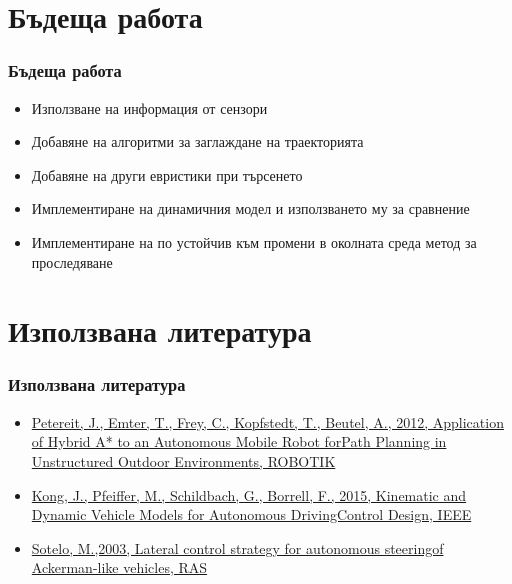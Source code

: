 \documentclass[hyperref=unicode]{beamer}
\begin{document}
  \section{Бъдеща работа}
    \begin{frame}
    \frametitle{Бъдеща работа}
     \begin{itemize}
      \item{Използване на информация от сензори}
      \item{Добавяне на алгоритми за заглаждане на траекторията}
      \item{Добавяне на други евристики при търсенето}
      \item{Имплементиране на динамичния модел и използването му за сравнение}
      \item{Имплементиране на по устойчив към промени в околната среда метод за проследяване}
    \end{itemize}  
    \end{frame}
  \section{Използвана литература}
    \begin{frame}
      \frametitle{Използвана литература}
      \begin{itemize}
        \item[]{\hyperlink{https://pdfs.semanticscholar.org/6e00/16024b257040db590d2de352556f64f46787.pdf}{Petereit, J., Emter, T., Frey, C., Kopfstedt, T., Beutel, A., 2012, Application of Hybrid A* to an Autonomous Mobile Robot forPath Planning in Unstructured Outdoor Environments, ROBOTIK}}
        \item[]{\hyperlink{https://borrelli.me.berkeley.edu/pdfpub/IV_KinematicMPC_jason.pdf}{Kong, J., Pfeiffer, M., Schildbach, G., Borrell, F., 2015, Kinematic  and  Dynamic  Vehicle  Models  for  Autonomous  DrivingControl  Design, IEEE}}
        \item[]{\hyperlink{http://www.robesafe.com/personal/sotelo/RASLateralControl2003.pdf}{Sotelo, M.,2003, Lateral control strategy for autonomous steeringof Ackerman-like vehicles, RAS}}
      \end{itemize}
     \end{frame}
\end{document}
